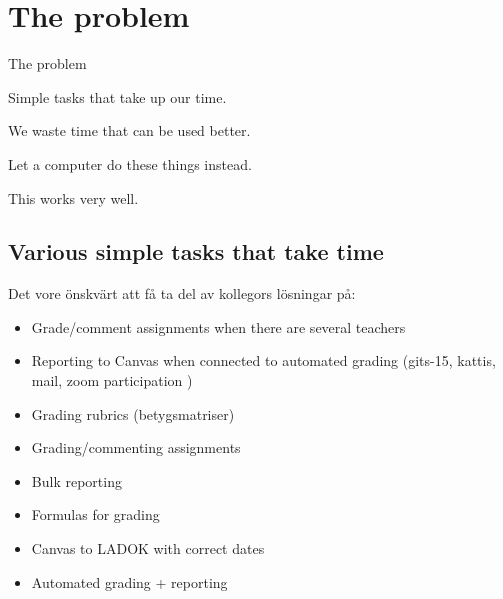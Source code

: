 \mode*

\section{The problem}

\begin{frame}[fragile]
  \begin{block}{The problem}
    \begin{description}
      \item<+>[What's the problem?] Simple tasks that take up our time.
      \item<+>[Why is it a problem?] We waste time that can be used better.
      \item<+>[What's the approach?] Let a computer do these things instead.
      \item<+>[What are the findings?] This works very well.
    \end{description}
  \end{block}
\end{frame}

\subsection{Various simple tasks that take time}

Det vore önskvärt att få ta del av kollegors lösningar på:

\begin{frame}[fragile]\label<2>{WishGradingReporting}
  \begin{example}[Grading]
    \begin{itemize}
      \item Grade/comment assignments when there are several teachers
      \item \alert<2>{Reporting to Canvas when connected to automated grading 
        (\eg gits-15, kattis, mail, zoom participation \etc)}
      \item Grading rubrics (betygsmatriser)
      \item \alert<2>{Grading/commenting assignments}
    \end{itemize}
  \end{example}

  \begin{example}[Reporting]
    \begin{itemize}
      \item \alert<2>{Bulk reporting}
      \item \alert<2>{Formulas for grading}
      \item \alert<2>{Canvas to LADOK with correct dates}
      \item \alert<2>{Automated grading + reporting}
    \end{itemize}
  \end{example}
\end{frame}

